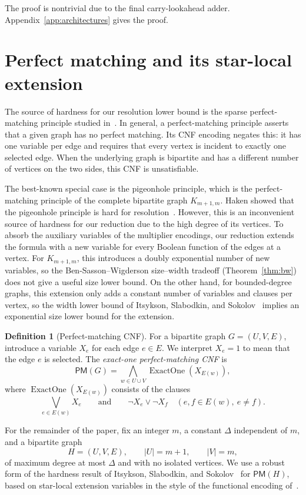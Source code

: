 \documentclass[11pt]{article}
\theoremstyle{definition}
\newtheorem{definition}[theorem]{Definition}
\theoremstyle{remark}
\newcommand{\PM}{\mathsf{PM}}
\begin{document}
The proof is nontrivial due to the final carry-lookahead adder. Appendix~\ref{app:architectures} gives the proof.

\section{Perfect matching and its star-local extension}
\label{sec:hard-source}

The source of hardness for our resolution lower bound is the sparse perfect-matching principle studied in~\cite{iss,ioss}. In general, a perfect-matching principle asserts that a given graph has no perfect matching. Its CNF encoding negates this: it has one variable per edge and requires that every vertex is incident to exactly one selected edge. When the underlying graph is bipartite and has a different number of vertices on the two sides, this CNF is unsatisfiable.

The best-known special case is the pigeonhole principle, which is the perfect-matching principle of the complete bipartite graph $K_{m+1,m}$. Haken showed that the pigeonhole principle is hard for resolution~\cite{haken}. However, this is an inconvenient source of hardness for our reduction due to the high degree of its vertices. To absorb the
auxiliary variables of the multiplier encodings, our reduction extends the formula with
a new variable for every Boolean function of the edges at a vertex. For $K_{m+1,m}$, this introduces a doubly exponential number of new variables, so the Ben-Sasson--Wigderson size--width tradeoff (Theorem~\ref{thm:bw}) does not give a useful size lower bound. On the other hand, for bounded-degree graphs, this extension only adds a constant number of variables and clauses per vertex, so the width lower bound of Itsykson, Slabodkin, and Sokolov~\cite{iss} implies an exponential size lower bound for the extension.

\begin{definition}[Perfect-matching CNF]
\label{def:pm}
For a bipartite graph $G=(U,V,E)$, introduce a variable $X_e$ for each edge $e\in E$. We interpret $X_e=1$ to mean that the edge $e$ is selected. The \emph{exact-one perfect-matching CNF} is
\[
\PM(G)
=
\bigwedge_{w\in U\cup V}
\operatorname{ExactOne}(X_{E(w)}),
\]
where $\operatorname{ExactOne}(X_{E(w)})$ consists of the clauses
\[
\bigvee_{e\in E(w)}X_e
\qquad\text{and}\qquad
\neg X_e\vee\neg X_f
\quad (e,f\in E(w),\ e\ne f).
\]
\end{definition}

For the remainder of the paper, fix an integer $m$, a constant $\Delta$ independent of $m$, and a bipartite graph
\[
H=(U,V,E),\qquad |U|=m+1,\qquad |V|=m,
\]
of maximum degree at most $\Delta$ and with no isolated vertices. We use a robust form of the hardness result of Itsykson, Slabodkin, and Sokolov~\cite{iss} for $\PM(H)$, based on star-local extension variables in the style of the functional encoding of~\cite{abrw}.
\end{document}
